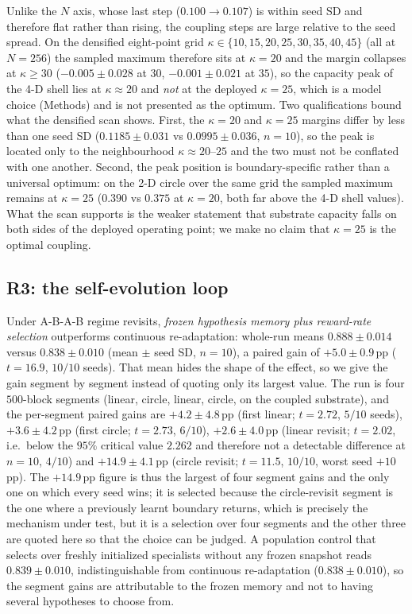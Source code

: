 \documentclass[preprint,12pt]{elsarticle}
\begin{document}
Unlike the $N$ axis, whose last step ($0.100\to0.107$) is within seed SD and
therefore flat rather than rising, the coupling steps are large relative to
the seed spread. On the densified eight-point grid
$\kappa\in\{10,15,20,25,30,35,40,45\}$ (all at $N=256$) the sampled maximum
therefore sits at $\kappa=20$ and the margin collapses at $\kappa\geq30$
($-0.005\pm0.028$ at $30$, $-0.001\pm0.021$ at $35$), so the capacity peak of
the 4-D shell lies at $\kappa\approx20$ and \emph{not} at the deployed
$\kappa=25$, which is a model choice (Methods) and is not presented as the
optimum. Two qualifications bound what the densified scan shows. First, the
$\kappa=20$ and $\kappa=25$ margins differ by less than one seed SD
($0.1185\pm0.031$ vs $0.0995\pm0.036$, $n=10$), so the peak is located only to
the neighbourhood $\kappa\approx20$--$25$ and the two must not be conflated
with one another. Second, the peak position is boundary-specific rather than a
universal optimum: on the 2-D circle over the same grid the sampled maximum
remains at $\kappa=25$ ($0.390$ vs $0.375$ at $\kappa=20$, both far above the
4-D shell values). What the scan supports is the
weaker statement that substrate capacity falls on both sides of the
deployed operating point; we make no claim that $\kappa=25$ is the optimal
coupling.

\subsection{R3: the self-evolution loop}
\label{sec:r3}

Under A-B-A-B regime revisits, \emph{frozen hypothesis memory plus
reward-rate selection} outperforms continuous re-adaptation: whole-run means
$0.888\pm0.014$ versus $0.838\pm0.010$ (mean $\pm$ seed SD, $n=10$), a paired
gain of $+5.0\pm0.9$\,pp ($t=16.9$, $10/10$ seeds). That mean hides the shape
of the effect, so we give the gain segment by segment instead of quoting only
its largest value. The run is four $500$-block segments (linear, circle,
linear, circle, on the coupled substrate), and the per-segment paired gains
are $+4.2\pm4.8$\,pp (first linear; $t=2.72$, $5/10$ seeds), $+3.6\pm4.2$\,pp
(first circle; $t=2.73$, $6/10$), $+2.6\pm4.0$\,pp (linear revisit; $t=2.02$,
i.e.\ below the $95\%$ critical value $2.262$ and therefore not a detectable
difference at $n=10$, $4/10$) and $+14.9\pm4.1$\,pp (circle revisit; $t=11.5$,
$10/10$, worst seed $+10$\,pp). The $+14.9$\,pp figure is thus the largest of
four segment gains and the only one on which every seed wins; it is selected
because the circle-revisit segment is the one where a previously learnt
boundary returns, which is precisely the mechanism under test, but it is a
selection over four segments and the other three are quoted here so that the
choice can be judged. A population control that selects over freshly
initialized specialists without any frozen snapshot reads
$0.839\pm0.010$, indistinguishable from continuous re-adaptation
($0.838\pm0.010$), so the segment gains are attributable to the frozen memory
and not to having several hypotheses to choose from.
\end{document}
